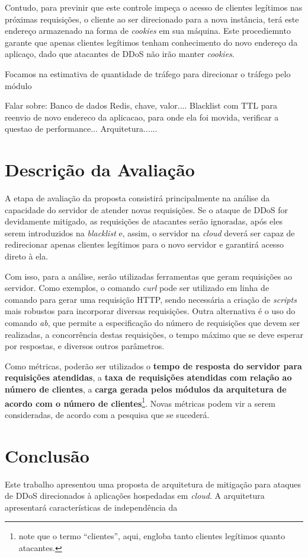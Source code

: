 \documentclass[a4paper, 12pt]{article}
\begin{document}
Contudo, para previnir que este controle impeça o acesso de clientes legítimos nas próximas requisições, o cliente ao ser direcionado para a nova instância, terá este endereço armazenado na forma de \emph{cookies} em sua máquina. Este procediemnto garante que apenas clientes legítimos tenham conhecimento do novo endereço da aplicaço, dado que atacantes de DDoS não irão manter \emph{cookies}.
 
Focamos na estimativa de quantidade de tráfego para direcionar o tráfego pelo módulo 


Falar sobre:
Banco de dados Redis, chave, valor....
Blacklist com TTL para reenvio de novo endereco da aplicacao, para onde ela foi movida, verificar a questao de performance...
Arquitetura......



\section{Descrição da Avaliação}
A etapa de avaliação da proposta consistirá principalmente na análise
da capacidade do servidor de atender novas requisições. Se o ataque de DDoS for devidamente
mitigado, as requisições de atacantes serão ignoradas, após eles serem introduzidos na \emph{blacklist}
e, assim, o servidor na \emph{cloud} deverá ser capaz de redirecionar apenas clientes legítimos 
para o novo servidor e garantirá acesso direto à ela.

Com isso, para a análise, serão utilizadas ferramentas que geram requisições ao servidor. Como exemplos, o comando 
\emph{curl} pode ser utilizado em linha de comando para gerar uma requisição HTTP, sendo necessária a criação de \emph{scripts} mais robustos para incorporar diversas requisições. Outra alternativa é o uso do comando \emph{ab}, que permite a especificação do número de requisições que devem ser realizadas, a concorrência destas requisições, o tempo máximo que se deve esperar por respostas, e diversos outros parâmetros.

Como métricas, poderão ser utilizados o \textbf{tempo de resposta do servidor para requisições atendidas}, a \textbf{taxa de requisições atendidas com relação ao número de clientes}, a \textbf{carga gerada pelos módulos da arquitetura de acordo com o número de clientes}\footnote{note que o termo ``clientes'', aqui, engloba tanto clientes legítimos quanto atacantes.}. Novas métricas podem vir a serem consideradas, de acordo com a pesquisa que se sucederá.

\section{Conclusão}
Este trabalho apresentou uma proposta de arquitetura de mitigação para ataques de DDoS direcionados à aplicações hospedadas em \emph{cloud}. A arquitetura apresentará características de independência da 
\end{document}
